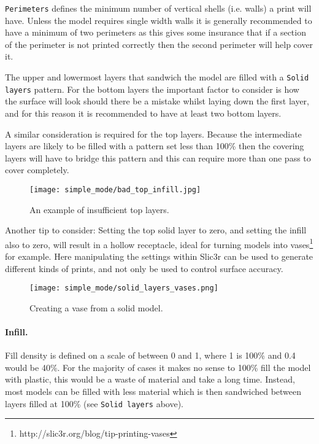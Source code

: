 \texttt{Perimeters} defines the minimum number of vertical shells (i.e. walls) a print will have.  Unless the model requires single width walls it is generally recommended to have a minimum of two perimeters as this gives some insurance that if a section of the perimeter is not printed correctly then the second perimeter will help cover it.

The upper and lowermost layers that sandwich the model are filled with a \texttt{Solid layers} pattern.  For the bottom layers the important factor to consider is how the surface will look should there be a mistake whilst laying down the first layer, and for this reason it is recommended to have at least two bottom layers.

A similar consideration is required for the top layers.  Because the intermediate layers are likely to be filled with a pattern set less than 100\% then the covering layers will have to bridge this pattern and this can require more than one pass to cover completely.

\begin{figure}[H]
\centering
\texttt{[image: simple\_mode/bad\_top\_infill.jpg]}
\caption{An example of insufficient top layers.}
\label{fig:bad_top_infill}
\end{figure}

Another tip to consider: Setting the top solid layer to zero, and setting the infill also to zero, will result in a hollow receptacle, ideal for turning models into vases\footnote{http://slic3r.org/blog/tip-printing-vases} for example.  Here manipulating the settings within Slic3r can be used to generate different kinds of prints, and not only be used to control surface accuracy.

\begin{figure}[H]
\centering
\texttt{[image: simple\_mode/solid\_layers\_vases.png]}
\caption{Creating a vase from a solid model.}
\label{fig:solid_layers_vases}
\end{figure}



\paragraph{Infill.} %
\label{par:simple_infill}
Fill density is defined on a scale of between 0 and 1, where 1 is 100\% and 0.4 would be 40\%.  For the majority of cases it makes no sense to 100\% fill the model with plastic, this would be a waste of material and take a long time.  Instead, most models can be filled with less material which is then sandwiched between layers filled at 100\% (see \texttt{Solid layers} above).

